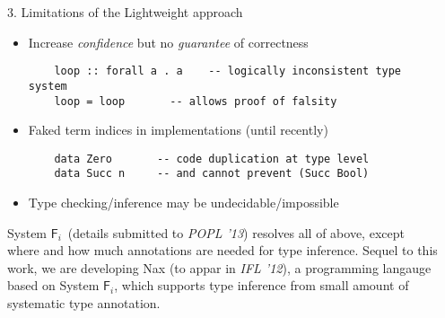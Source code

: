 \documentclass[final]{beamer}
\newcommand{\Fi}{\ensuremath{\mathsf{F}_{\!i}}}
\begin{document}
\begin{frame}[fragile]
\begin{columns}[t]
\begin{column}{.315\linewidth}
\begin{block}{3. Limitations of the Lightweight approach}
\begin{itemize}
\item Increase \emph{confidence} but no \emph{guarantee} of correctness
	\begin{lstlisting}
	loop :: forall a . a    -- logically inconsistent type system
	loop = loop       -- allows proof of falsity
	\end{lstlisting}
\item Faked term indices in implementations (until recently)
	\begin{lstlisting}
	data Zero       -- code duplication at type level
	data Succ n     -- and cannot prevent (Succ Bool)
	\end{lstlisting}
\item Type checking/inference may be undecidable/impossible
\end{itemize}
\begin{spacing}{1}\small
System \Fi\ (details submitted to \textit{POPL '13}) resolves all of above,
except where and how much annotations are needed for type inference.
Sequel to this work, we are developing Nax (to appar in \textit{IFL '12}),
a programming langauge based on System \Fi, which supports type inference
from small amount of systematic type annotation.
\end{spacing}
\end{block}


\end{column}
\begin{column}{.315\linewidth}


\end{column}
\end{columns}
\end{frame}
\end{document}
